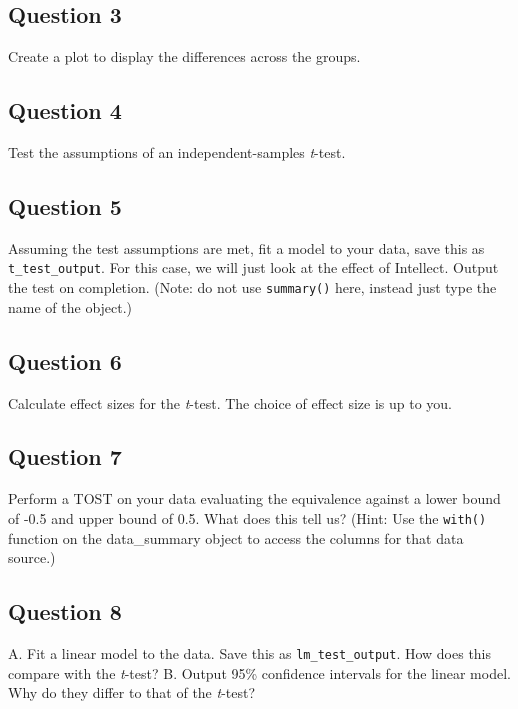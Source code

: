 \documentclass[
]{book}
\begin{document}
\hypertarget{question-3-9}{%
\subsection{Question 3}\label{question-3-9}}

Create a plot to display the differences across the groups.

\hypertarget{question-4-9}{%
\subsection{Question 4}\label{question-4-9}}

Test the assumptions of an independent-samples \emph{t}-test.

\hypertarget{question-5-9}{%
\subsection{Question 5}\label{question-5-9}}

Assuming the test assumptions are met, fit a model to your data, save this as \texttt{t\_test\_output}. For this case, we will just look at the effect of Intellect. Output the test on completion. (Note: do not use \texttt{summary()} here, instead just type the name of the object.)

\hypertarget{question-6-9}{%
\subsection{Question 6}\label{question-6-9}}

Calculate effect sizes for the \emph{t}-test. The choice of effect size is up to you.

\hypertarget{question-7-8}{%
\subsection{Question 7}\label{question-7-8}}

Perform a TOST on your data evaluating the equivalence against a lower bound of -0.5 and upper bound of 0.5. What does this tell us? (Hint: Use the \texttt{with()} function on the data\_summary object to access the columns for that data source.)

\hypertarget{question-8-7}{%
\subsection{Question 8}\label{question-8-7}}

A. Fit a linear model to the data. Save this as \texttt{lm\_test\_output}. How does this compare with the \emph{t}-test?
B. Output 95\% confidence intervals for the linear model. Why do they differ to that of the \emph{t}-test?

  
\end{document}
